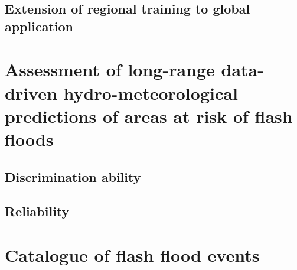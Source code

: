 \subsection{Extension of regional training to global application}


\section{Assessment of long-range data-driven hydro-meteorological predictions of areas at risk of flash floods}
\label{verif_data_driven_long_fc}

\subsection{Discrimination ability}

\subsection{Reliability}


\section{Catalogue of flash flood events}
\label{verif_case_study}